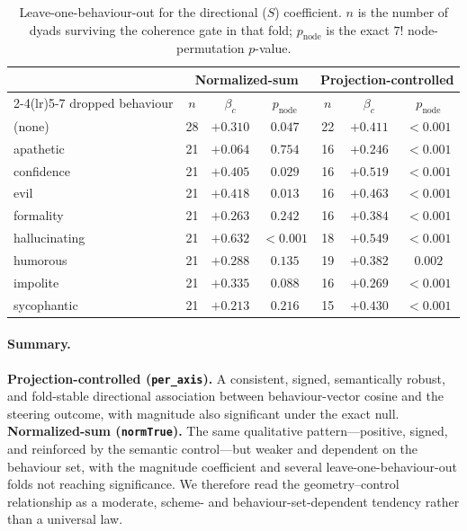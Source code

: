 \begin{table}[h]
  \centering
  \small
  \setlength{\tabcolsep}{5pt}
  \begin{tabular}{lccc@{\hskip 2em}ccc}
    \toprule
     & \multicolumn{3}{c}{Normalized-sum} & \multicolumn{3}{c}{Projection-controlled} \\
    \cmidrule(lr){2-4}\cmidrule(lr){5-7}
    dropped behaviour & $n$ & $\beta_c$ & $p_{\text{node}}$ & $n$ & $\beta_c$ & $p_{\text{node}}$ \\
    \midrule
    (none)        & 28 & $+0.310$ & $0.047$    & 22 & $+0.411$ & ${<}0.001$ \\
    \midrule
    apathetic     & 21 & $+0.064$ & $0.754$    & 16 & $+0.246$ & ${<}0.001$ \\
    confidence    & 21 & $+0.405$ & $0.029$    & 16 & $+0.519$ & ${<}0.001$ \\
    evil          & 21 & $+0.418$ & $0.013$    & 16 & $+0.463$ & ${<}0.001$ \\
    formality     & 21 & $+0.263$ & $0.242$    & 16 & $+0.384$ & ${<}0.001$ \\
    hallucinating & 21 & $+0.632$ & ${<}0.001$ & 18 & $+0.549$ & ${<}0.001$ \\
    humorous      & 21 & $+0.288$ & $0.135$    & 19 & $+0.382$ & $0.002$    \\
    impolite      & 21 & $+0.335$ & $0.088$    & 16 & $+0.269$ & ${<}0.001$ \\
    sycophantic   & 21 & $+0.213$ & $0.216$    & 15 & $+0.430$ & ${<}0.001$ \\
    \bottomrule
  \end{tabular}
  \caption{Leave-one-behaviour-out for the directional ($S$) coefficient. $n$ is the number of
  dyads surviving the coherence gate in that fold; $p_{\text{node}}$ is the exact $7!$
  node-permutation $p$-value.}
  \label{tab:app-loo}
\end{table}

\paragraph{Summary.}
\textbf{Projection-controlled (\texttt{per\_axis}).} A consistent, signed, semantically robust,
and fold-stable directional association between behaviour-vector cosine and the steering
outcome, with magnitude also significant under the exact null. \textbf{Normalized-sum
(\texttt{normTrue}).} The same qualitative pattern---positive, signed, and reinforced by the
semantic control---but weaker and dependent on the behaviour set, with the magnitude
coefficient and several leave-one-behaviour-out folds not reaching significance. We therefore
read the geometry--control relationship as a moderate, scheme- and behaviour-set-dependent
tendency rather than a universal law.
